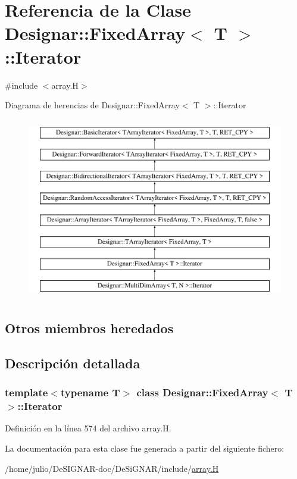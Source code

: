 \hypertarget{class_designar_1_1_fixed_array_1_1_iterator}{}\section{Referencia de la Clase Designar\+:\+:Fixed\+Array$<$ T $>$\+:\+:Iterator}
\label{class_designar_1_1_fixed_array_1_1_iterator}


{\ttfamily \#include $<$array.\+H$>$}

Diagrama de herencias de Designar\+:\+:Fixed\+Array$<$ T $>$\+:\+:Iterator\begin{figure}[H]
\begin{center}
\leavevmode
\includegraphics[height=8.000000cm]{class_designar_1_1_fixed_array_1_1_iterator}
\end{center}
\end{figure}
\subsection*{Otros miembros heredados}


\subsection{Descripción detallada}
\subsubsection*{template$<$typename T$>$\newline
class Designar\+::\+Fixed\+Array$<$ T $>$\+::\+Iterator}



Definición en la línea 574 del archivo array.\+H.



La documentación para esta clase fue generada a partir del siguiente fichero\+:\begin{DoxyCompactItemize}
\item 
/home/julio/\+De\+S\+I\+G\+N\+A\+R-\/doc/\+De\+Si\+G\+N\+A\+R/include/\hyperlink{array_8_h}{array.\+H}\end{DoxyCompactItemize}

